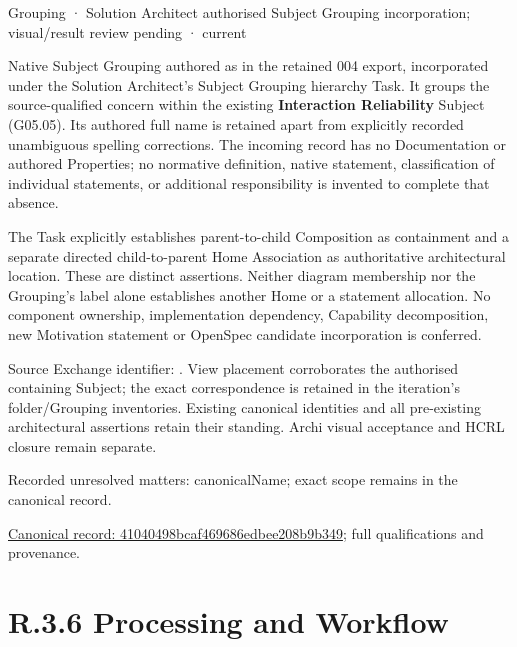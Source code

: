 \label{element:41040498bcaf469686edbee208b9b349}
{\small Grouping · Solution Architect authorised Subject Grouping incorporation; visual/result review pending · current}\par

Native Subject Grouping authored as \texttt{} in the retained 004 export,
incorporated under the Solution Architect's Subject Grouping hierarchy Task.
It groups the source-qualified \texttt{} concern within
the existing \textbf{Interaction Reliability} Subject (G05.05). Its authored full name
is retained apart from explicitly recorded unambiguous spelling corrections.
The incoming record has no Documentation or authored Properties; no normative
definition, native statement, classification of individual statements, or
additional responsibility is invented to complete that absence.



The Task explicitly establishes parent-to-child Composition as containment and
a separate directed child-to-parent Home Association as authoritative architectural
location. These are distinct assertions. Neither diagram membership nor the
Grouping's label alone establishes another Home or a statement allocation.
No component ownership, implementation dependency, Capability decomposition,
new Motivation statement or OpenSpec candidate incorporation is conferred.



Source Exchange identifier: \texttt{}. View placement corroborates
the authorised containing Subject; the exact correspondence is retained in the
iteration's folder/Grouping inventories. Existing canonical identities and all
pre-existing architectural assertions retain their standing. Archi visual
acceptance and HCRL closure remain separate.


{\small Recorded unresolved matters: canonicalName; exact scope remains in the canonical record.}\par
{\footnotesize \href{../../../../continuum/grouping/41040498bcaf469686edbee208b9b349.md}{Canonical record: 41040498bcaf469686edbee208b9b349}; full qualifications and provenance.}\par
\section*{R.3.6 Processing and Workflow}
\label{navigation:R.3.6}

